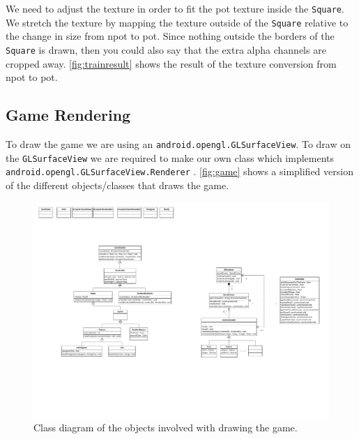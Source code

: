 We need to adjust the texture in order to fit the \ac{pot} texture inside the \lstinline|Square|. We stretch the texture by mapping the texture outside of the \lstinline|Square| relative to the change in size from \ac{npot} to \ac{pot}. Since nothing outside the borders of the \lstinline|Square| is drawn, then you could also say that the extra alpha channels are cropped away. \autoref{fig:trainresult} shows the result of the texture conversion from \ac{npot} to \ac{pot}.

\subsection{Game Rendering}\label{sec:gamerendering}

To draw the game we are using an \lstinline|android.opengl.GLSurfaceView|. To draw on the \lstinline|GLSurfaceView| we are required to make our own class which implements \lstinline|android.opengl.GLSurfaceView.Renderer| \citep{androidopengl}. \autoref{fig:game} shows a simplified version of the different objects/classes that draws the game.

\begin{figure}[H]
\centering
\includegraphics[page=3,width=1\linewidth]{img/opengl.pdf}
\caption{Class diagram of the objects involved with drawing the game.}
\label{fig:game}
\end{figure}

